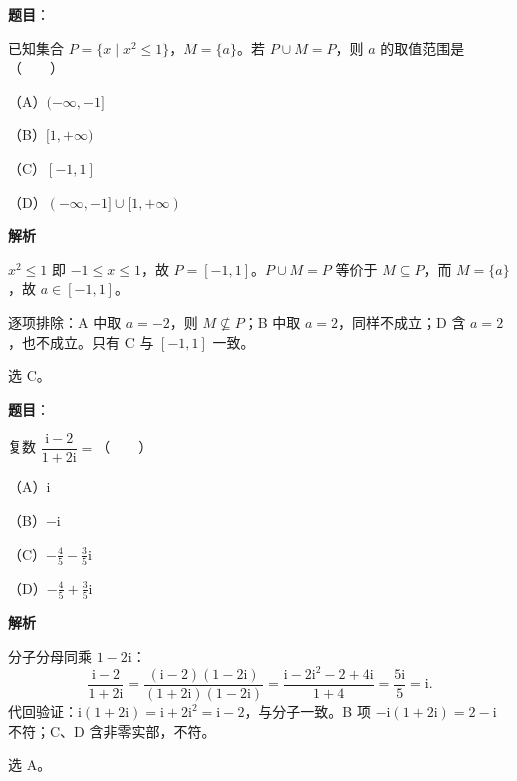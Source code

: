 \begin{answer}

\textbf{题目}：

已知集合 $P=\{x\mid x^2\leqslant 1\}$，$M=\{a\}$。若 $P\cup M=P$，则 $a$ 的取值范围是\mbox{（　　）}

（A）$(-\infty,-1]$

（B）$[1,+\infty)$

（C）$[-1,1]$

（D）$(-\infty,-1]\cup[1,+\infty)$

\textbf{解析}

$x^2\leqslant1$ 即 $-1\leqslant x\leqslant1$，故 $P=[-1,1]$。$P\cup M=P$ 等价于 $M\subseteq P$，而 $M=\{a\}$，故 $a\in[-1,1]$。

逐项排除：A 中取 $a=-2$，则 $M\not\subseteq P$；B 中取 $a=2$，同样不成立；D 含 $a=2$，也不成立。只有 C 与 $[-1,1]$ 一致。

选 C。


\end{answer}
\begin{answer}

\textbf{题目}：

复数 $\dfrac{\mathrm{i}-2}{1+2\mathrm{i}}=$\mbox{（　　）}

（A）$\mathrm{i}$

（B）$-\mathrm{i}$

（C）$-\frac45-\frac35\mathrm{i}$

（D）$-\frac45+\frac35\mathrm{i}$

\textbf{解析}

分子分母同乘 $1-2\mathrm{i}$：
\nopagebreak[4]
\[
\frac{\mathrm{i}-2}{1+2\mathrm{i}}
=\frac{(\mathrm{i}-2)(1-2\mathrm{i})}{(1+2\mathrm{i})(1-2\mathrm{i})}
=\frac{\mathrm{i}-2\mathrm{i}^2-2+4\mathrm{i}}{1+4}
=\frac{5\mathrm{i}}{5}=\mathrm{i}.
\]
代回验证：$\mathrm{i}(1+2\mathrm{i})=\mathrm{i}+2\mathrm{i}^2=\mathrm{i}-2$，与分子一致。B 项 $-\mathrm{i}(1+2\mathrm{i})=2-\mathrm{i}$ 不符；C、D 含非零实部，不符。

选 A。


\end{answer}
